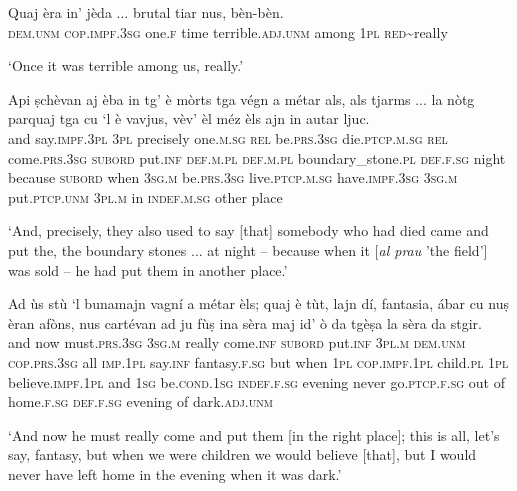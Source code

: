 \begin{linenumbers}
\gll Quaj èra in’ jèda ... brutal tiar nus, bèn-bèn.   \\
\textsc{dem.unm} \textsc{cop.impf.3sg} one.\textsc{f} time {} terrible.\textsc{adj.unm} among \textsc{1pl} \textsc{red}\textasciitilde{really}\\
\end{linenumbers}
\medskip
\glt `Once it was terrible among us, really.'
\medskip

\begin{linenumbers}
\gll  Api ṣchèvan aj èba in tg’ è mòrts tga végn a métar als, als tjarms ... la nòtg parquaj tga cu `l è vavjus, vèv’ èl méz èls ajn in autar ljuc.  \\
and say.\textsc{impf.3pl} \textsc{3pl} precisely one.\textsc{m.sg} \textsc{rel} be.\textsc{prs.3sg} die.\textsc{ptcp.m.sg} \textsc{rel} come.\textsc{prs.3sg} \textsc{subord} put.\textsc{inf} \textsc{def.m.pl} \textsc{def.m.pl} boundary\_stone.\textsc{pl} {} \textsc{def.f.sg} night because \textsc{subord} when \textsc{3sg.m} be.\textsc{prs.3sg} live.\textsc{ptcp.m.sg} have.\textsc{impf.3sg} \textsc{3sg.m} put.\textsc{ptcp.unm} \textsc{3pl.m} in \textsc{indef.m.sg} other place \\
\end{linenumbers}
\medskip
\glt `And, precisely, they also used to say [that] somebody who had died came and put the, the boundary stones ... at night – because when it [\textit{al prau} 'the field'] was sold – he had put them in another place.'
\medskip

\begin{linenumbers}
\gll Ad ùs stù `l bunamajn vagní a métar èls; quaj è tùt, lajn dí, fantasia, ábar cu nuṣ èran afòns, nus cartévan ad ju fùṣ ina sèra maj id’ ò da tgèṣa la sèra da stgir.\\
and now must.\textsc{prs.3sg} \textsc{3sg.m} really come.\textsc{inf} \textsc{subord} put.\textsc{inf} \textsc{3pl.m} \textsc{dem.unm} \textsc{cop.prs.3sg} all \textsc{imp.1pl} say.\textsc{inf} fantasy.\textsc{f.sg} but when \textsc{1pl} \textsc{cop.impf.1pl} child.\textsc{pl} \textsc{1pl} believe.\textsc{impf.1pl} and \textsc{1sg} be.\textsc{cond.1sg} \textsc{indef.f.sg} evening never go.\textsc{ptcp.f.sg} out of home.\textsc{f.sg} \textsc{def.f.sg} evening of dark.\textsc{adj.unm}\hspace{-2mm}\\
  \end{linenumbers}
\medskip
\glt `And now he must really come and put them [in the right place]; this is all, let’s say, fantasy, but when we were children we would believe [that], but I would never have left home in the evening when it was dark.'
\medskip

